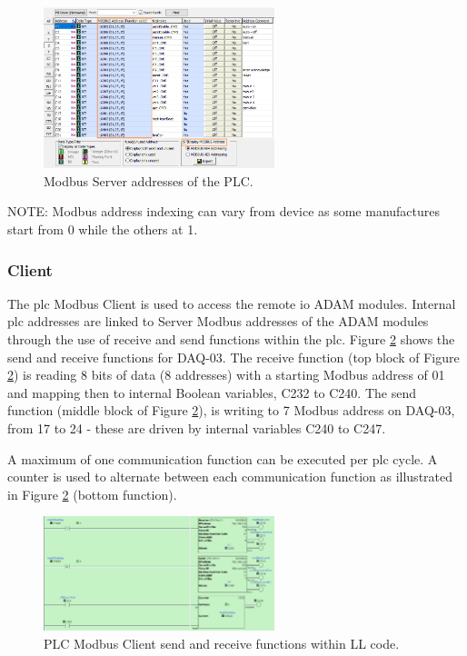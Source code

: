         \begin{figure}[H]
            \centering
            \includegraphics[width = 0.6\textwidth]{2_images/modbusAdd}
            \caption{Modbus Server addresses of the PLC.}
            \label{fig:modbusAdd}
        \end{figure}
        
            NOTE: Modbus address indexing can vary from device as some manufactures start from 0 while the others at 1. 
            
        \subsubsection{Client} \label{sec:modbusClient}
            The \acrshort{plc} Modbus Client is used to access the remote \acrshort{io} ADAM modules. Internal \acrshort{plc} addresses are linked to Server Modbus addresses of the ADAM modules through the use of receive and send functions within the \acrshort{plc}. Figure \ref{fig:plcModbusClient} shows the send and receive functions for DAQ-03. The receive function (top block of Figure \ref{fig:plcModbusClient}) is reading 8 bits of data (8 addresses) with a starting Modbus address of 01 and mapping then to internal Boolean variables, C232 to C240. The send function (middle block of Figure \ref{fig:plcModbusClient}), is writing to 7 Modbus address on DAQ-03, from 17 to 24 - these are driven by internal variables C240 to C247.

            A maximum of one communication function can be executed per \acrshort{plc} cycle. A counter is used to alternate between each communication function as illustrated in Figure \ref{fig:plcModbusClient} (bottom function).

        \begin{figure}[H]
            \centering
            \includegraphics[width = 0.6\textwidth]{2_images/plcModbusClient}
            \caption{PLC Modbus Client send and receive functions within LL code.}
            \label{fig:plcModbusClient}
        \end{figure}
            
